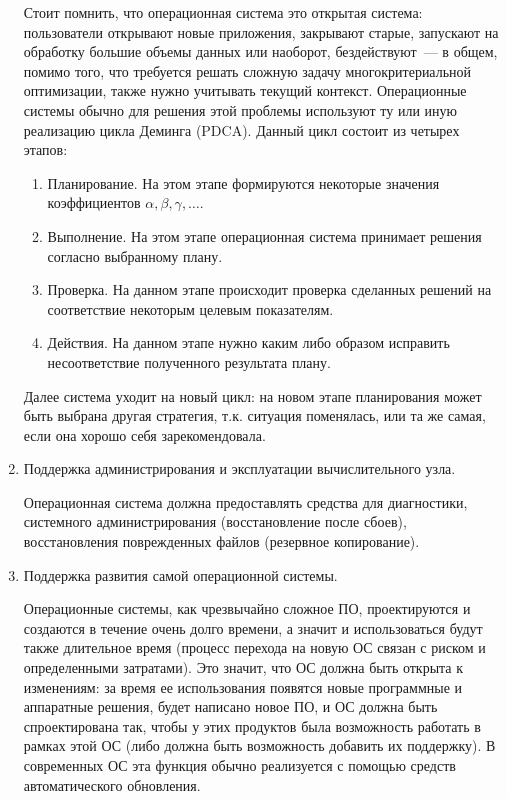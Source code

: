 \begin{enumerate}
  Стоит помнить, что операционная система это открытая система: пользователи
  открывают новые приложения, закрывают старые, запускают на обработку большие
  объемы данных или наоборот, бездействуют~--- в общем, помимо того, что
  требуется решать сложную задачу многокритериальной оптимизации, также нужно
  учитывать текущий контекст. Операционные системы обычно для решения этой
  проблемы используют ту или иную реализацию цикла Деминга (PDCA). Данный цикл
  состоит из четырех этапов:

  \begin{enumerate}
  \item
    Планирование. На этом этапе формируются некоторые значения коэффициентов
    \(\alpha, \beta, \gamma, \dotsc\).

  \item
    Выполнение. На этом этапе операционная система принимает решения согласно
    выбранному плану.

  \item
    Проверка. На данном этапе происходит проверка сделанных решений на
    соответствие некоторым целевым показателям.

  \item
    Действия. На данном этапе нужно каким либо образом исправить несоответствие
    полученного результата плану.
  \end{enumerate}

  Далее система уходит на новый цикл: на новом этапе планирования может быть
  выбрана другая стратегия, т.к. ситуация поменялась, или та же самая, если она
  хорошо себя зарекомендовала.

\item
  Поддержка администрирования и эксплуатации вычислительного узла.

  Операционная система должна предоставлять средства для диагностики, системного
  администрирования (восстановление после сбоев), восстановления поврежденных
  файлов (резервное копирование).

\item
  Поддержка развития самой операционной системы.
  
  Операционные системы, как чрезвычайно сложное ПО, проектируются и создаются в
  течение очень долго времени, а значит и использоваться будут также длительное
  время (процесс перехода на новую ОС связан с риском и определенными
  затратами). Это значит, что ОС должна быть открыта к изменениям: за время ее
  использования появятся новые программные и аппаратные решения, будет написано
  новое ПО, и ОС должна быть спроектирована так, чтобы у этих продуктов была
  возможность работать в рамках этой ОС (либо должна быть возможность добавить
  их поддержку). В современных ОС эта функция обычно реализуется с помощью
  средств автоматического обновления.
\end{enumerate}

